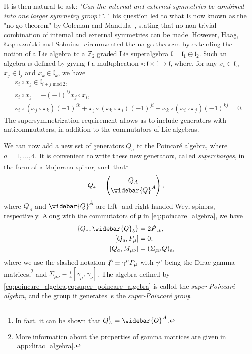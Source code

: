 It is then natural to ask: \emph{"Can the internal and external symmetries be combined into one larger symmetry group?"}.
This question led to what is now known as the "no-go theorem" by Coleman and Mandula~\cite{Coleman:1967ad}, stating that no non-trivial combination of internal and external symmetries can be made.
However, Haag, \L opusza\'nski and Sohnius~\cite{Haag:1974qh} circumvented the no-go theorem by extending the notion of a Lie algebra to a $\mathbb{Z}_2$ graded Lie superalgebra $\mathfrak{l}=\mathfrak{l}_1\oplus\mathfrak{l}_2$. 
Such an algebra is defined by giving $\mathfrak{l}$ a multiplication $\circ:\mathfrak{l}\times\mathfrak{l}\to\mathfrak{l}$, where, for any $x_i\in\mathfrak{l}_i$, $x_j\in\mathfrak{l}_j$ and $x_k\in\mathfrak{l}_k$, we have
\begin{align*}
    &x_i \circ x_j \in \mathfrak{l}_{i+j \operatorname{mod} 2},
    \tag{Grading}
    \\
    &x_i \circ x_j = -(-1)^{ij} x_j \circ x_i,
    \tag{Supersymmetrization}
    \\
    &x_i \circ (x_j \circ x_k) (-1)^{ik}
    + x_j \circ (x_k \circ x_i)(-1)^{ji}
    + x_k \circ (x_i \circ x_j)(-1)^{kj}
    = 0.
    \tag{Generalized Jacobi Identity}
\end{align*}
The supersymmetrization requirement allows us to include generators with anticommutators, in addition to the commutators of Lie algebras.

We can now add a new set of generators $Q_a$ to the Poincar\'e algebra, where $a=1,\ldots,4$.
It is convenient to write these new generators, called \emph{supercharges}, in the form of a Majorana spinor, such that\footnote{In fact, it can be shown that $Q_A^\dagger = \widebar{Q}^{\dot{A}}$.}
\begin{equation}
    Q_a = \begin{pmatrix}
        Q_A \\ \widebar{Q}^{\dot{A}}
    \end{pmatrix},
\end{equation}
where $Q_A$ and $\widebar{Q}^{\dot{A}}$ are left- and right-handed Weyl spinors, respectively.
Along with the commutators of $\mathfrak{p}$ in \cref{eq:poincare_algebra}, we have
\begin{subequations}
\label{eq:super_poincare_algebra}
\begin{align}
    \{Q_a,\widebar{Q}_b\} &= 2\slashed{P}_{ab},
    \\
    [Q_a,P_\mu] &= 0,
    \\
    [Q_a,M_{\mu\nu}] &= (\Sigma_{\mu\nu}Q)_a,
\end{align}
\end{subequations}
where we use the slashed notation $\slashed{P}\equiv\gamma^\mu P_\mu$ with $\gamma^\mu$ being the Dirac gamma matrices,\footnote{More information about the properties of gamma matrices are given in \cref{app:dirac_algebra}.} and $\Sigma_{\mu\nu} \equiv \frac{i}{4}[\gamma_\mu,\gamma_\nu]$. The algebra defined by \cref{eq:poincare_algebra,eq:super_poincare_algebra} is called the \emph{super-Poincar\'e algebra}, and the group it generates is the \emph{super-Poincar\'e group}.

